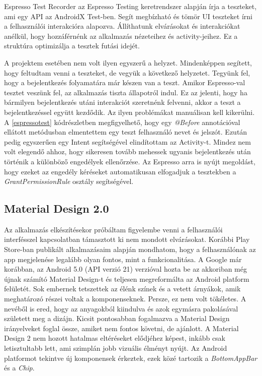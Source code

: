 \documentclass{thesis-ekf}
\theoremstyle{definition}
\theoremstyle{remark}
\begin{document}
Espresso Test Recorder az Espresso Testing keretrendszer alapján írja a teszteket, ami egy API az AndroidX Test-ben.
Segít megbízható és tömör UI teszteket írni a felhasználói interakcióra alapozva.
Állíthatunk elvárásokat és interakciókat anélkül, hogy hozzáférnénk az alkalmazás nézeteihez és activity-jeihez.
Ez a struktúra optimizálja a tesztek futási idejét. \cite{espresso}

A projektem esetében nem volt ilyen egyszerű a helyzet.
Mindenképpen segített, hogy feltudtam venni a teszteket, de vegyük a következő helyzetet.
Tegyünk fel, hogy a bejelentkezés folyamatára már készen van a teszt.
Amikor Espresso-val tesztet veszünk fel, az alkalmazás tiszta állapotról indul.
Ez az jelenti, hogy ha bármilyen bejelentkezés utáni interakciót szeretnénk felvenni, akkor a teszt a bejelentkezéssel együtt kezdődik.
Az ilyen problémákat manuálisan kell kikerülni.
A \ref{espressotest} kódrészletben megfigyelhető, hogy egy \emph{@Before} annotációval ellátott metódusban elmentettem egy teszt felhasználó nevet és jelszót.
Ezután pedig egyszerűen egy Intent segítségével elindítottam az Activity-t.
Mindez nem volt elegendő ahhoz, hogy sikeresen tovább mehessek ugyanis bejelentkezés után történik a különböző engedélyek ellenőrzése.
Az Espresso arra is nyújt megoldást, hogy ezeket az engedély kéréseket automatikusan elfogadjuk a tesztekben a \emph{GrantPermissionRule} osztály segítségével.



\subsection{Material Design 2.0}

Az alkalmazás elkészítésekor próbáltam figyelembe venni a felhasználói interfésszel kapcsolatban támasztott ki nem mondott elvárásokat.
Korábbi Play Store-ban publikált alkalmazásaim alapján mondhatom, hogy a felhasználónak az app megjelenése legalább olyan fontos, mint a funkcionalitása.
A Google már korábban, az Android 5.0 (API verzió 21) verzióval hozta be az akkoriban még újnak számító Material Design-t és teljesen megreformálta az Android platform felületét.
Sok embernek tetszettek az élénk színek és a vetett árnyákok, amik meghatározó részei voltak a komponenseknek. Persze, ez nem volt tökéletes.
A nevéből is ered, hogy az anyagokból kiindulva és azok egymásra pakolásával született meg a dizájn. 
Kicsit pontosabban fogalmazva a Material Design irányelveket foglal össze, amiket nem fontos követni, de ajánlott. 
A Material Design 2 nem hozott hatalmas eltéréseket elődjéhez képest, inkább csak letisztultabb lett, ami szimplán jobb vizuális élményt nyújt.
Az Android platformot tekintve új komponensek érkeztek, ezek közé tartozik a \emph{BottomAppBar} és a \emph{Chip}.
\end{document}
